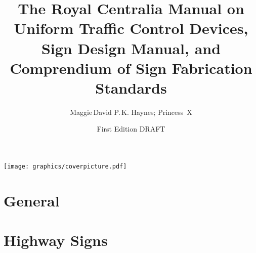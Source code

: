 \documentclass[9pt]{memoir}
\begin{document}
\title{The Royal Centralia Manual on Uniform Traffic Control Devices, Sign Design Manual, and Comprendium of Sign Fabrication Standards}
\author{Maggie\,David P.\,K. Haynes; Princess~X}
\date{First Edition DRAFT}


\maketitle

{\centering\texttt{[image: graphics/coverpicture.pdf]}\par}

\cleartorecto

\tableofcontents*





\listoffigures

\part{General}



\part{Highway Signs}




























\end{document}
